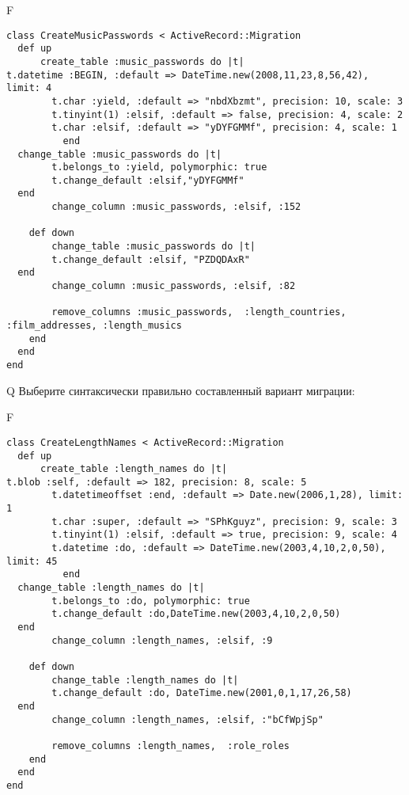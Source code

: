 F
\begin{verbatim}
class CreateMusicPasswords < ActiveRecord::Migration
  def up
	  create_table :music_passwords do |t|
t.datetime :BEGIN, :default => DateTime.new(2008,11,23,8,56,42), limit: 4
		t.char :yield, :default => "nbdXbzmt", precision: 10, scale: 3
		t.tinyint(1) :elsif, :default => false, precision: 4, scale: 2
		t.char :elsif, :default => "yDYFGMMf", precision: 4, scale: 1
		  end
  change_table :music_passwords do |t|
		t.belongs_to :yield, polymorphic: true
 		t.change_default :elsif,"yDYFGMMf"
  end
 		change_column :music_passwords, :elsif, :152
   
	def down
		change_table :music_passwords do |t|
		t.change_default :elsif, "PZDQDAxR"
  end
 		change_column :music_passwords, :elsif, :82
   
		remove_columns :music_passwords,  :length_countries, :film_addresses, :length_musics 
    end 
  end
end

\end{verbatim}

Q
Выберите синтаксически правильно составленный вариант миграции:

F
\begin{verbatim}
class CreateLengthNames < ActiveRecord::Migration
  def up
	  create_table :length_names do |t|
t.blob :self, :default => 182, precision: 8, scale: 5
		t.datetimeoffset :end, :default => Date.new(2006,1,28), limit: 1
		t.char :super, :default => "SPhKguyz", precision: 9, scale: 3
		t.tinyint(1) :elsif, :default => true, precision: 9, scale: 4
		t.datetime :do, :default => DateTime.new(2003,4,10,2,0,50), limit: 45
		  end
  change_table :length_names do |t|
		t.belongs_to :do, polymorphic: true
 		t.change_default :do,DateTime.new(2003,4,10,2,0,50)
  end
 		change_column :length_names, :elsif, :9
   
	def down
		change_table :length_names do |t|
		t.change_default :do, DateTime.new(2001,0,1,17,26,58)
  end
 		change_column :length_names, :elsif, :"bCfWpjSp"
   
		remove_columns :length_names,  :role_roles 
    end 
  end
end

\end{verbatim}

